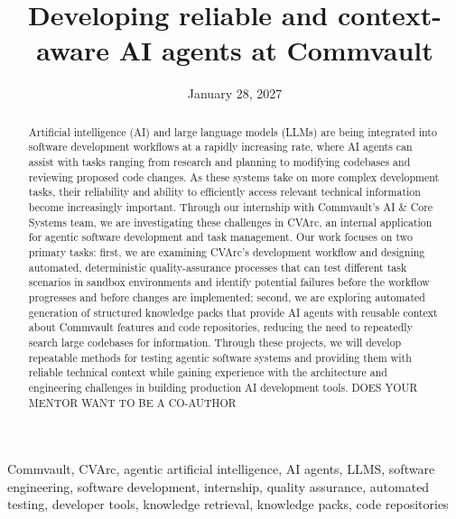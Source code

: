 \documentclass[12pt,conference,onecolumn]{IEEEtran}
\title{Developing reliable and context-aware {AI} agents at {C}ommvault}
\author{%
\IEEEauthorblockN{Ishaan Sharma}\IEEEauthorblockA{Science \& Engineering\\Manalapan High School\\Englishtown, NJ\\\href{mailto:427mreznik@frhsd.com}{427mreznik@frhsd.com}}\and
\IEEEauthorblockN{Sashank Yellapragada}\IEEEauthorblockA{Science \& Engineering\\Manalapan High School\\Englishtown, NJ\\\href{mailto:427ssanrkitya@frhsd.com}{427ssankritya@frhsd.com}}
}
\date{January 28, 2027}
\newcommand{\keywords}{Commvault, CVArc, agentic artificial intelligence, AI agents, LLMS, software engineering, software development, internship, quality assurance, automated testing, developer tools, knowledge retrieval, knowledge packs, code repositories}
\begin{document}
\maketitle 

\begin{abstract}
Artificial intelligence (AI) and large language models (LLMs) are being integrated into software development workflows at a rapidly increasing rate, where AI agents can assist with tasks ranging from research and planning to modifying codebases and reviewing proposed code changes. As these systems take on more complex development tasks, their reliability and ability to efficiently access relevant technical information become increasingly important. Through our internship with Commvault’s AI \& Core Systems team, we are investigating these challenges in CVArc, an internal application for agentic software development and task management. Our work focuses on two primary tasks: first, we are examining CVArc’s development workflow and designing automated, deterministic quality-assurance processes that can test different task scenarios in sandbox environments and identify potential failures before the workflow progresses and before changes are implemented; second, we are exploring automated generation of structured knowledge packs that provide AI agents with reusable context about Commvault features and code repositories, reducing the need to repeatedly search large codebases for information. Through these projects, we will develop repeatable methods for testing agentic software systems and providing them with reliable technical context while gaining experience with the architecture and engineering challenges in building production AI development tools. 
DOES YOUR MENTOR WANT TO BE A CO-AUTHOR
\end{abstract}

\begin{IEEEkeywords}
\keywords
\end{IEEEkeywords}
\end{document}

